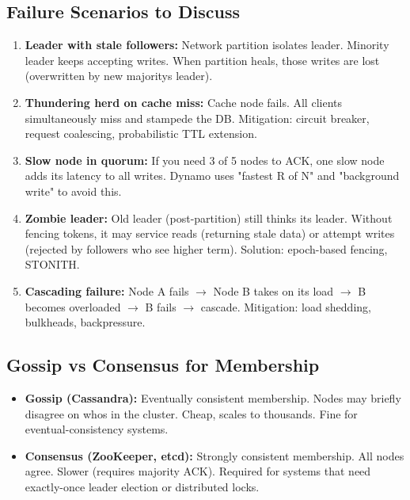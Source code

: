 \documentclass[11pt]{article}
\providecommand{\tightlist}{\setlength{\itemsep}{1pt}\setlength{\parskip}{0pt}}
\begin{document}
\subsection{Failure Scenarios to Discuss}\label{failure-scenarios-to-discuss}

\begin{enumerate}
\def\labelenumi{\arabic{enumi}.}
\tightlist
\item
  \textbf{Leader with stale followers:} Network partition isolates leader. Minority leader keeps accepting writes. When partition heals, those writes are lost (overwritten by new majority\textquotesingle s leader).
\item
  \textbf{Thundering herd on cache miss:} Cache node fails. All clients simultaneously miss and stampede the DB. Mitigation: circuit breaker, request coalescing, probabilistic TTL extension.
\item
  \textbf{Slow node in quorum:} If you need 3 of 5 nodes to ACK, one slow node adds its latency to all writes. Dynamo uses "fastest R of N" and "background write" to avoid this.
\item
  \textbf{Zombie leader:} Old leader (post-partition) still thinks it\textquotesingle s leader. Without fencing tokens, it may service reads (returning stale data) or attempt writes (rejected by followers who see higher term). Solution: epoch-based fencing, STONITH.
\item
  \textbf{Cascading failure:} Node A fails \(\rightarrow\) Node B takes on its load \(\rightarrow\) B becomes overloaded \(\rightarrow\) B fails \(\rightarrow\) cascade. Mitigation: load shedding, bulkheads, backpressure.
\end{enumerate}

\subsection{Gossip vs Consensus for Membership}\label{gossip-vs-consensus-for-membership}

\begin{itemize}
\tightlist
\item
  \textbf{Gossip (Cassandra):} Eventually consistent membership. Nodes may briefly disagree on who\textquotesingle s in the cluster. Cheap, scales to thousands. Fine for eventual-consistency systems.
\item
  \textbf{Consensus (ZooKeeper, etcd):} Strongly consistent membership. All nodes agree. Slower (requires majority ACK). Required for systems that need exactly-once leader election or distributed locks.
\end{itemize}
\end{document}
